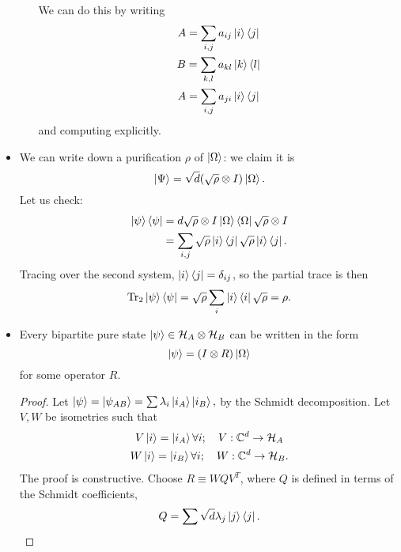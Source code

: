 \begin{itemize}
\begin{itemize}
        We can do this by writing
        \begin{gather*}
            A=\sum_{i,j} a_{ij}\left| i \right>\left< j \right|\\
            B=\sum_{k,l} a_{kl}\left| k \right>\left< l \right|\\
            A=\sum_{i,j} a_{ji}\left| i \right>\left< j \right|
        \end{gather*}
        and computing explicitly.
    \end{itemize}
    \item We can write down a purification $\rho$ of $\left| \Omega \right>$: we claim it is
    \begin{equation}
        \left| \Psi \right>=\sqrt{d}(\sqrt{\rho}\otimes I) \left| \Omega \right>.
    \end{equation}
    Let us check:
    \begin{align*}
        \left| \psi \right>\left< \psi \right|&=d\sqrt{\rho} \otimes I \left| \Omega \right>\left< \Omega \right| \sqrt{\rho}\otimes I\\
            &= \sum_{i,j}\sqrt{\rho}\left| i \right>\left< j \right|\sqrt{\rho} \left| i \right>\left< j \right|.
    \end{align*}
    Tracing over the second system, $\left| i \right>\left< j \right|=\delta_{ij}$, so the partial trace is then
    \begin{equation}
        \operatorname{Tr}_2 \left| \psi \right>\left< \psi \right| = \sqrt{\rho} \sum_i \left| i \right>\left< i \right| \sqrt{\rho} = \rho.
    \end{equation}
    \item Every bipartite pure state $\left| \psi \right>\in \mathcal H_A \otimes \mathcal H_B$ can be written in the form
    \begin{equation}\label{bipartitedecomp}
        \left| \psi \right>=(I\otimes R) \left| \Omega \right>
    \end{equation}
    for some operator $R$.
    \begin{proof}
        Let $\left| \psi \right>=\left| \psi_{AB} \right>=\sum \lambda_i \left| i_A \right>\left| i_B \right>,$ by the Schmidt decomposition. Let $V,W$ be isometries such that
        \begin{gather}
            V\left| i \right>=\left| i_A \right>\forall i ; \quad V:\mathbb{C}^d \to \mathcal H_A\\
            W\left| i \right>=\left| i_B \right>\forall i; \quad W:\mathbb{C}^d \to \mathcal H_B.
        \end{gather}
        The proof is constructive. Choose $R \equiv W Q V^T$, where $Q$ is defined in terms of the Schmidt coefficients,
        \begin{equation}
            Q=\sum \sqrt{d} \lambda_j \left| j \right>\left< j \right|.
        \end{equation}

\end{proof}
\end{itemize}
